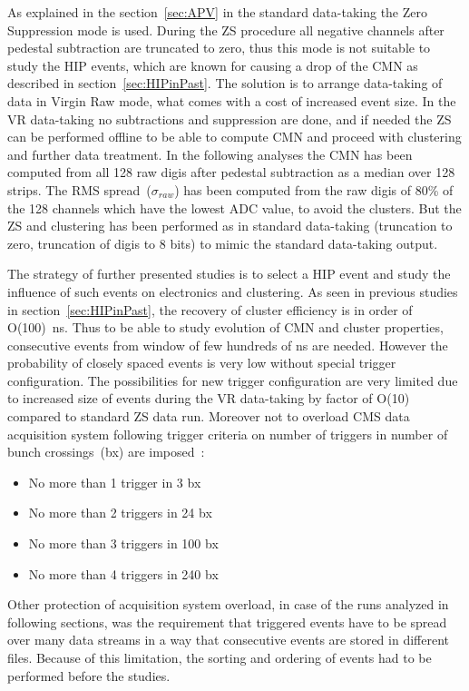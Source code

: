 As explained in the section~\ref{sec:APV} in the standard data-taking the Zero Suppression mode is used. During the ZS procedure all negative channels after pedestal subtraction are truncated to zero, thus this mode is not suitable to study the HIP events, which are known for causing a drop of the CMN as described in section~\ref{sec:HIPinPast}. The solution is to arrange data-taking of data in Virgin Raw mode, what comes with a cost of increased event size. In the VR data-taking no subtractions and suppression are done, and if needed the ZS can be performed offline to be able to compute CMN and proceed with clustering and further data treatment. In the following analyses the CMN has been computed from all 128 raw digis after pedestal subtraction as a median over 128 strips. The RMS spread~($\sigma_{raw}$) has been computed from the raw digis of 80\% of the 128 channels which have the lowest ADC value, to avoid the clusters. But the ZS and clustering has been performed as in standard data-taking (truncation to zero, truncation of digis to 8 bits) to mimic the standard data-taking output.

The strategy of further presented studies is to select a HIP event and study the influence of such events on electronics and clustering. As seen in previous studies in section~\ref{sec:HIPinPast}, the recovery of cluster efficiency is in order of O(100)~ns. Thus to be able to study evolution of CMN and cluster properties, consecutive events from window of few hundreds of ns are needed. However the probability of closely spaced events is very low without special trigger configuration. The possibilities for new trigger configuration are very limited due to increased size of events during the VR data-taking by factor of O(10) compared to standard ZS data run. Moreover not to overload CMS data acquisition system following trigger criteria on number of triggers in number of bunch crossings~(bx) are imposed~\cite{website:VRtrigger}:

\begin{itemize}
\item{No more than 1 trigger in 3 bx}
\item{No more than 2 triggers in 24 bx}
\item{No more than 3 triggers in 100 bx}
\item{No more than 4 triggers in 240 bx}
\end{itemize}

Other protection of acquisition system overload, in case of the runs analyzed in following sections, was the requirement that triggered events have to be spread over many data streams in a way that consecutive events are stored in different files. Because of this limitation, the sorting and ordering of events had to be performed before the studies.


